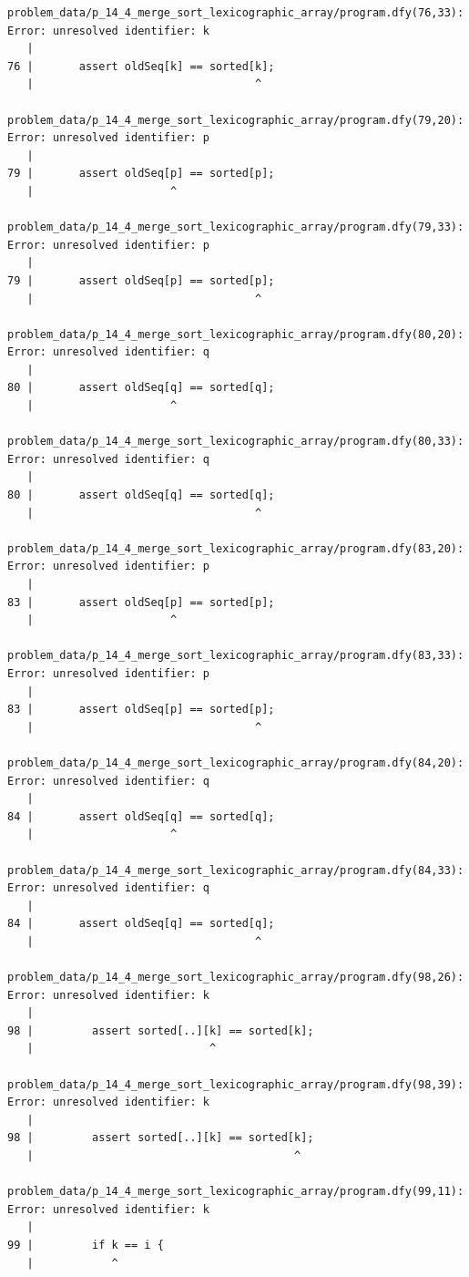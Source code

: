 \documentclass{article}
\begin{document}
\begin{lstlisting}
problem_data/p_14_4_merge_sort_lexicographic_array/program.dfy(76,33): Error: unresolved identifier: k
   |
76 |       assert oldSeq[k] == sorted[k];
   |                                  ^

problem_data/p_14_4_merge_sort_lexicographic_array/program.dfy(79,20): Error: unresolved identifier: p
   |
79 |       assert oldSeq[p] == sorted[p];
   |                     ^

problem_data/p_14_4_merge_sort_lexicographic_array/program.dfy(79,33): Error: unresolved identifier: p
   |
79 |       assert oldSeq[p] == sorted[p];
   |                                  ^

problem_data/p_14_4_merge_sort_lexicographic_array/program.dfy(80,20): Error: unresolved identifier: q
   |
80 |       assert oldSeq[q] == sorted[q];
   |                     ^

problem_data/p_14_4_merge_sort_lexicographic_array/program.dfy(80,33): Error: unresolved identifier: q
   |
80 |       assert oldSeq[q] == sorted[q];
   |                                  ^

problem_data/p_14_4_merge_sort_lexicographic_array/program.dfy(83,20): Error: unresolved identifier: p
   |
83 |       assert oldSeq[p] == sorted[p];
   |                     ^

problem_data/p_14_4_merge_sort_lexicographic_array/program.dfy(83,33): Error: unresolved identifier: p
   |
83 |       assert oldSeq[p] == sorted[p];
   |                                  ^

problem_data/p_14_4_merge_sort_lexicographic_array/program.dfy(84,20): Error: unresolved identifier: q
   |
84 |       assert oldSeq[q] == sorted[q];
   |                     ^

problem_data/p_14_4_merge_sort_lexicographic_array/program.dfy(84,33): Error: unresolved identifier: q
   |
84 |       assert oldSeq[q] == sorted[q];
   |                                  ^

problem_data/p_14_4_merge_sort_lexicographic_array/program.dfy(98,26): Error: unresolved identifier: k
   |
98 |         assert sorted[..][k] == sorted[k];
   |                           ^

problem_data/p_14_4_merge_sort_lexicographic_array/program.dfy(98,39): Error: unresolved identifier: k
   |
98 |         assert sorted[..][k] == sorted[k];
   |                                        ^

problem_data/p_14_4_merge_sort_lexicographic_array/program.dfy(99,11): Error: unresolved identifier: k
   |
99 |         if k == i {
   |            ^


\end{lstlisting}
\end{document}
